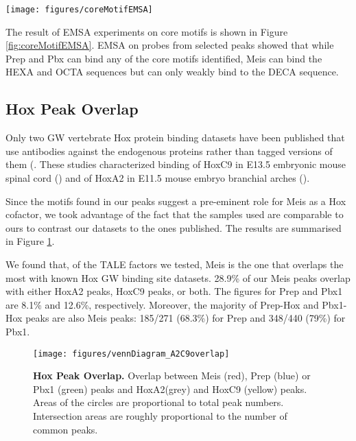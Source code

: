 \begin{SCfigure}[]
  \centering
  \texttt{[image: figures/coreMotifEMSA]}
  \caption[EMSA Experiments on Core Motifs]{\textbf{EMSA Experiments on Core Motifs.} leyenda leyenda leyenda leyenda leyenda leyenda leyenda leyenda leyenda leyenda leyenda leyenda leyenda leyenda leyenda}
  \label{fig:coreMotifEMSA}
\end{SCfigure}

The result of \ac{EMSA} experiments on core motifs is shown in Figure \ref{fig:coreMotifEMSA}. \ac{EMSA} on probes from selected peaks showed that while Prep and Pbx can bind any of the core motifs identified, Meis can bind the HEXA and OCTA sequences but can only weakly bind to the DECA sequence.

\subsection{Hox Peak Overlap}

Only two \ac{GW} vertebrate Hox protein binding datasets have been published that use antibodies against the endogenous proteins rather than tagged versions of them (\cite{Jung2010,Donaldson2012}. These studies characterized binding of HoxC9 in E13.5 embryonic mouse spinal cord (\cite{Jung2010}) and of HoxA2 in E11.5 mouse embryo branchial arches (\cite{Donaldson2012}).

Since the motifs found in our peaks suggest a pre-eminent role for Meis as a Hox cofactor, we took advantage of the fact that the samples used are comparable to ours to contrast our datasets to the ones published. The results are summarised in Figure \ref{fig:HoxOverlap}.

We found that, of the \ac{TALE} factors we tested, Meis is the one that overlaps the most with known Hox \ac{GW} binding site datasets. 28.9\% of our Meis peaks overlap with either HoxA2 peaks, HoxC9 peaks, or both. The figures for Prep and Pbx1 are 8.1\% and 12.6\%, respectively. Moreover, the majority of Prep-Hox and Pbx1-Hox peaks are also Meis peaks: 185/271 (68.3\%) for Prep and 348/440 (79\%) for Pbx1. 

\begin{figure}[]
  \centering
  \texttt{[image: figures/vennDiagram\_A2C9overlap]}
  \caption[Hox Peak Overlap]{\textbf{Hox Peak Overlap.} Overlap between Meis (red), Prep (blue) or Pbx1 (green) peaks and HoxA2(grey) and HoxC9 (yellow) peaks. Areas of the circles are proportional to total peak numbers. Intersection areas are roughly proportional to the number of common peaks.}
  \label{fig:HoxOverlap}
\end{figure}

